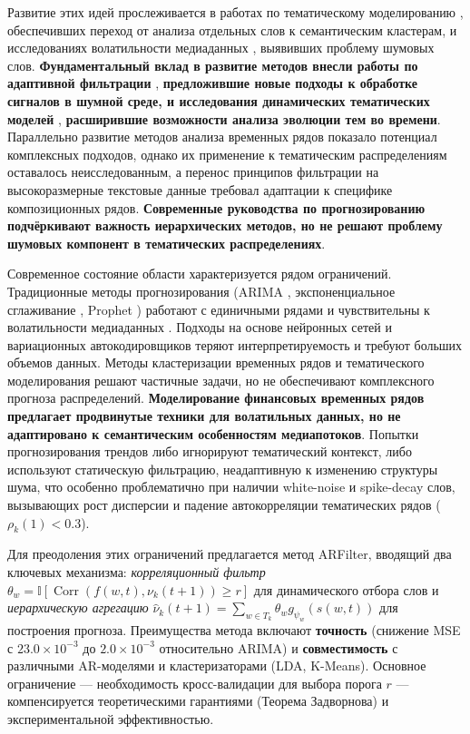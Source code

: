 \documentclass[14pt,a4paper]{article}
\begin{document}
Развитие этих идей прослеживается в работах по тематическому моделированию \cite{blei2003latent, sinaga2020unsupervised}, 
обеспечивших переход от анализа отдельных слов к семантическим кластерам, и исследованиях волатильности медиаданных 
\cite{rappaz2019dynamic}, выявивших проблему шумовых слов. 
\textbf{Фундаментальный вклад в развитие методов внесли работы по адаптивной фильтрации} \cite{Cichocki2009}, 
\textbf{предложившие новые подходы к обработке сигналов в шумной среде, и исследования динамических тематических моделей} 
\cite{Blei2012}, \textbf{расширившие возможности анализа эволюции тем во времени}. 
Параллельно развитие методов анализа временных рядов \cite{Shumway2000, Bouchaud2018, Tsay2005, Shumway2017} 
показало потенциал комплексных подходов, однако их применение к тематическим распределениям оставалось неисследованным, 
а перенос принципов фильтрации \cite{Gardner1985} на высокоразмерные текстовые данные требовал адаптации 
к специфике композиционных рядов. \textbf{Современные руководства по прогнозированию} \cite{Hyndman2018} 
\textbf{подчёркивают важность иерархических методов, но не решают проблему шумовых компонент в тематических распределениях}.

Современное состояние области характеризуется рядом ограничений. Традиционные методы прогнозирования 
(ARIMA \cite{box1970time}, экспоненциальное сглаживание \cite{Gardner1985}, Prophet \cite{Taylor2018}) 
работают с единичными рядами и чувствительны к волатильности медиаданных \cite{rappaz2019dynamic}. 
Подходы на основе нейронных сетей \cite{Das2020VAE} и вариационных автокодировщиков теряют интерпретируемость 
и требуют больших объемов данных. Методы кластеризации временных рядов \cite{Grabovoy2019} и тематического моделирования 
\cite{sinaga2020unsupervised, blei2003latent} решают частичные задачи, но не обеспечивают комплексного прогноза распределений. 
\textbf{Моделирование финансовых временных рядов} \cite{Zivot2003} \textbf{предлагает продвинутые техники для волатильных данных, 
но не адаптировано к семантическим особенностям медиапотоков}. 
Попытки прогнозирования трендов \cite{choi2012predicting, holt2004forecasting} либо игнорируют тематический контекст, 
либо используют статическую фильтрацию, неадаптивную к изменению структуры шума, что особенно проблематично 
при наличии white-noise и spike-decay слов, вызывающих рост дисперсии и падение автокорреляции тематических рядов 
(\(\rho_k(1) < 0.3\)).

Для преодоления этих ограничений предлагается метод ARFilter, вводящий два ключевых механизма: \textit{корреляционный фильтр} \(\theta_w = \mathbb{I}[\operatorname{Corr}(f(w,t), \nu_k(t+1)) \geq r]\) для динамического отбора слов и \textit{иерархическую агрегацию} \(\widehat{\nu}_k(t+1) = \sum_{w \in T_k} \theta_w g_{\psi_w}(s(w,t))\) для построения прогноза. Преимущества метода включают \textbf{точность} (снижение MSE с \(23.0 \times 10^{-3}\) до \(2.0 \times 10^{-3}\) относительно ARIMA) и \textbf{совместимость} с различными AR-моделями и кластеризаторами (LDA, K-Means). Основное ограничение — необходимость кросс-валидации для выбора порога \(r\) — компенсируется теоретическими гарантиями (Теорема Задворнова) и экспериментальной эффективностью.
\end{document}

